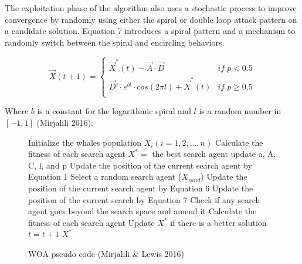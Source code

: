 \documentclass[11pt]{article}
\begin{document}
{    The exploitation phase of the algorithm also uses a stochastic process to improve convergence by randomly using either the spiral or double loop attack pattern on a candidate solution.
    Equation 7 introduces a spiral pattern and a mechanism to randomly switch between the spiral and encircling behaviors.

    \begin{equation}
        \vec{X}(t+1) =
        \begin{cases}
            \vec{X}^*(t) - \vec{A}\cdot\vec{D} &if \; p < 0.5\\
            \vec{D}'\cdot e^{bl} \cdot cos(2\pi l) + \vec{X}^*(t) &if \; p \geq 0.5\\
        \end{cases}
    \end{equation}

    Where $b$ is a constant for the logarithmic spiral and $l$ is a random number in $[-1, 1]$ (Mirjalili 2016).

    \begin{figure}
        \caption{WOA pseudo code (Mirjalili \& Lewis 2016)}
        \begin{algorithm}[H]
            \scriptsize
            \begin{algorithmic}[1]
                \STATE Initialize the whales population $X_i(i = 1,2, \dots, n)$
                \STATE Calculate the fitness of each search agent
                \STATE $X^* = $ the best search agent
                        \STATE update a, A, C, l, and p
                                \STATE Update the position of the current search agent by Equation 1
                            \ELSE
                                \STATE Select a random search agent ($X_{rand}$)
                                \STATE Update the position of the current search agent by Equation 6
                            \ENDIF
                        \ELSE
                            \STATE Update the position of the current search by Equation 7
                        \ENDIF
                    \ENDFOR
                    \STATE Check if any search agent goes beyond the search space and amend it
                    \STATE Calculate the fitness of each search agent
                    \STATE Update $X^*$ if there is a better solution
                    \STATE $t = t+1$
                \ENDWHILE
                \STATE \RETURN $X^*$ 
            \end{algorithmic}
        \end{algorithm}
    \end{figure}

}
\end{document}
